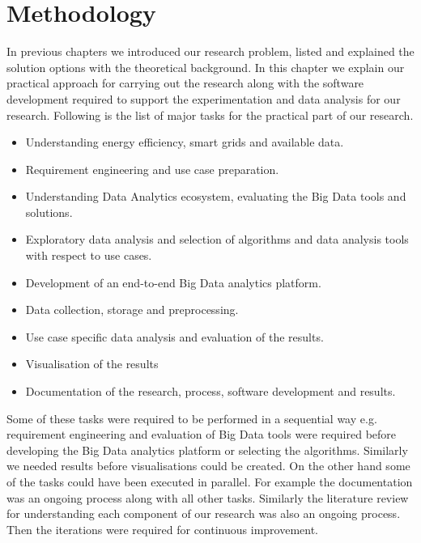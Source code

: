 \chapter{Methodology }
\label{Methodology}
In previous chapters we introduced our research problem, listed and explained the solution options with the theoretical background. In this chapter we explain our practical approach for carrying out the research along with the software development required to support the experimentation and data analysis for our research. Following is the list of major tasks for the practical part of our research.
\begin{itemize}
\item Understanding energy efficiency, smart grids and available data.
\item Requirement engineering and use case preparation.
\item Understanding Data Analytics ecosystem, evaluating the Big Data tools and solutions.
\item Exploratory data analysis and selection of algorithms and data analysis tools with respect to use cases. 
\item Development of an end-to-end Big Data analytics platform.
\item Data collection, storage and preprocessing.
\item Use case specific data analysis and evaluation of the results.
\item Visualisation of the results 
\item Documentation of the research, process, software development and results.
\end{itemize}
Some of these tasks were required to be performed in a sequential way e.g. requirement engineering and evaluation of Big Data tools were required before developing the Big Data analytics platform or selecting the algorithms. Similarly we needed results before visualisations could be created. On the other hand some of the tasks could have been executed in parallel. For example the documentation was an ongoing process along with all other tasks. Similarly the literature review for understanding each component of our research was also an ongoing process. Then the iterations were required for continuous improvement.

